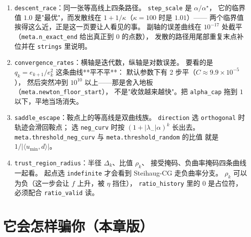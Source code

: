 \begin{enumerate}
  \item \texttt{descent\_race}：同一张等高线上四条路径。
        \texttt{step\_scale} 是 $\alpha/\alpha^\star$，
        它的临界值 $1.0$ 是"最优"，而发散线在 $1+1/\kappa$（$\kappa=100$ 时是 $1.01$）——
        两个临界值挨得这么近，正是这一页要让人看见的事。
        副轴的误差曲线在 $10^{-17}$ 处截平（\texttt{meta.n\_exact\_end} 给出真正到 $0$ 的点数），
        发散的路径用尾部重复末点补位并在 \texttt{strings} 里说明。
  \item \texttt{convergence\_rates}：横轴是迭代数，纵轴是对数误差。
        要看的是 $q_k=e_{k+1}/e_k^2$ 这条曲线**平不平**：
        默认参数下有 2 步平（$C\approx9.9\times10^{-5}$），
        然后突然冲到 $10^{10}$ 以上——那是舍入地板（\texttt{meta.newton\_floor\_start}），
        不是"收敛越来越快"。把 \texttt{alpha\_cap} 拖到 $1$ 以下，平地当场消失。
  \item \texttt{saddle\_escape}：鞍点上的等高线是双曲线族。
        \texttt{direction} 选 \texttt{orthogonal} 时轨迹会滑回鞍点；
        选 \texttt{neg\_curv} 时按 $(1+|\lambda_-|\alpha)^k$ 长出去。
        \texttt{meta.threshold\_neg\_curv} 与 \texttt{meta.threshold\_random} 的比值
        就是 $1/|\langle u_{\min},d\rangle|$。
  \item \texttt{trust\_region\_radius}：半径 $\Delta_k$、比值 $\rho_k$、
        接受掩码、负曲率掩码四条曲线一起看。
        起点选 \texttt{indefinite} 才会看到 Steihaug-CG 走负曲率分支。
        $\rho_k$ 可以为负（这一步会让 $f$ 上升，被 $\eta$ 挡住），
        \texttt{ratio\_history} 里的 $0$ 是占位符，必须配合 \texttt{ratio\_valid} 读。
\end{enumerate}



\section{它会怎样骗你（本章版）}

